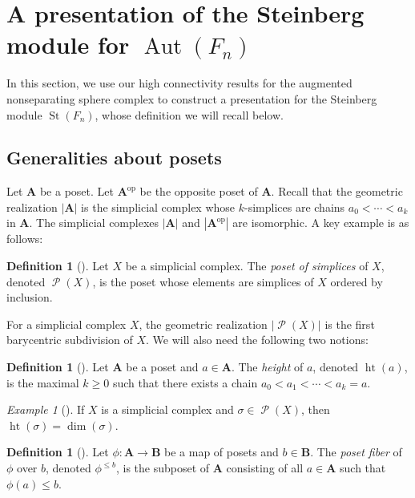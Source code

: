 \documentclass[11pt]{amsart}
\numberwithin{equation}{section}
\theoremstyle{plain}
\theoremstyle{definition}
\newtheorem{defn}[theorem]{Definition}
\newenvironment{definition}[1][]{\begin{defn}[#1]\pushQED{\qed}}{\popQED \end{defn}}
\theoremstyle{remark}
\newtheorem{eg}[theorem]{Example}
\newenvironment{example}[1][]{\begin{eg}[#1] \pushQED{\qed}}{\popQED \end{eg}}
\DeclareMathOperator{\Aut}{Aut}
\newcommand\bA{\ensuremath{\mathbf{A}}}
\newcommand\bB{\ensuremath{\mathbf{B}}}
\DeclareMathOperator{\St}{St}
\DeclareMathOperator{\height}{ht}
\DeclareMathOperator{\Poset}{\mathcal{P}}
\DeclareMathOperator{\opp}{op}
\begin{document}
\section{A presentation of the Steinberg module for \texorpdfstring{$\Aut(F_n)$}{Aut(Fn)}}
\label{section:presentation}

In this section, we use our high connectivity results for the augmented nonseparating
sphere complex to construct a presentation for the Steinberg module $\St(F_n)$, whose
definition we will recall below.

\subsection{Generalities about posets}

Let $\bA$ be a poset.  Let $\bA^{\opp}$ be the opposite poset of $\bA$.  Recall that the
geometric realization $|\bA|$ is the simplicial complex whose
$k$-simplices are chains $a_0 < \cdots < a_k$ in $\bA$.  The
simplicial complexes $|\bA|$ and $|\bA^{\opp}|$ are isomorphic.  A key
example is as follows:

\begin{definition}
Let $X$ be a simplicial complex.  The {\em poset of simplices} of $X$, denoted $\Poset(X)$, is the
poset whose elements are simplices of $X$ ordered by inclusion.
\end{definition}

For a simplicial complex $X$, the geometric realization $|\Poset(X)|$ is the first barycentric
subdivision of $X$.  We will also need the following two notions:

\begin{definition}
Let $\bA$ be a poset and $a \in \bA$. The {\em height} of $a$, denoted $\height(a)$, 
is the maximal $k \geq 0$ such that there exists a chain $a_0 < a_1 < \cdots < a_k = a$.
\end{definition}

\begin{example}
If $X$ is a simplicial complex and $\sigma \in \Poset(X)$, then $\height(\sigma) = \dim(\sigma)$.
\end{example}

\begin{definition}
Let $\phi \colon \bA \rightarrow \bB$ be a map of posets and $b \in \bB$.  The {\em poset fiber} of $\phi$ over $b$, denoted 
$\phi^{\leq b}$, is the subposet of $\bA$ consisting of all $a \in \bA$ such that $\phi(a) \leq b$.
\end{definition}
\end{document}
